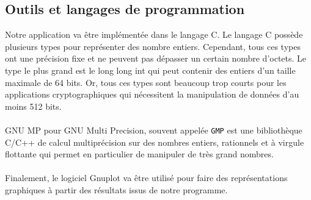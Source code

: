 	\subsection{Outils et langages de programmation}
	Notre application va être implémentée dans le langage {\ttfamily C}. Le langage {\ttfamily C} possède plusieurs types pour représenter des nombre entiers. Cependant, tous ces types ont une précision fixe et ne peuvent pas dépasser un certain nombre d'octets. Le type le plus grand est le {\ttfamily long long int} qui peut contenir des entiers d'un taille maximale de 64 bits. Or, tous ces types sont beaucoup trop courts pour les applications cryptographiques qui nécessitent la manipulation de données d'au moins 512 bits.
	\paragraph{}{\ttfamily GNU MP} pour {\ttfamily GNU Multi Precision}, souvent appelée \lstinline!GMP! est une bibliothèque {\ttfamily C}/{\ttfamily C++} de calcul multiprécision sur des nombres entiers, rationnels et à virgule flottante qui permet en particulier de manipuler de très grand nombres.
	
	\paragraph{} Finalement, le logiciel {\ttfamily Gnuplot} va être utilisé pour faire des représentations graphiques à partir des résultats issus de notre programme.
	